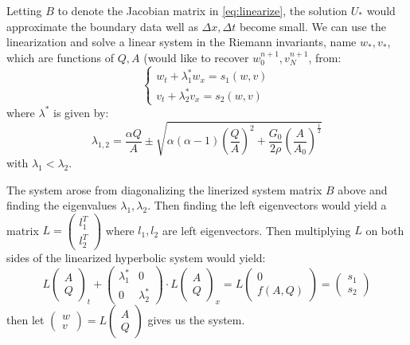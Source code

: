 \documentclass[12pt]{article} %
\begin{document}
Letting $B$ to denote the Jacobian matrix in \eqref{eq:linearize}, the solution $U_{*}$ would approximate the boundary data well as $\Delta x,\Delta t$ become small. We can use the linearization and solve a linear system in the Riemann invariants, name $w_{*}, v_{*}$, which are functions of $Q,A$ (would like to recover $w_0^{n+1}, v_{N}^{n+1}$, from:
$$
	\begin{cases}
		w_t + \lambda_1^{*} w_x = s_1(w,v) \\
		v_t + \lambda_2^{*} v_x = s_2(w,v)
	\end{cases}
$$ where $\lambda^{*}$ is given by:
$$
	\lambda_{1,2} = \frac{\alpha Q}{A}\pm \sqrt{\alpha(\alpha-1)(\frac{Q}{A})^2 + \frac{G_0}{2\rho}(\frac{A}{A_0})^{\frac12}}
$$ with $\lambda_1 < \lambda_2$.

The system arose from diagonalizing the linerized system matrix $B$ above and finding the eigenvalues $\lambda_1,\lambda_2$. Then finding the left eigenvectors would yield a matrix $L = \begin{pmatrix}
	l_1^{T} \\
	l_2^{T}
\end{pmatrix}$ where $l_1,l_2$ are left eigenvectors. Then multiplying $L$ on both sides of the linearized hyperbolic system would yield:
$$
	L\begin{pmatrix}
		 A \\
		 Q
	\end{pmatrix}_{t}
	+
	\begin{pmatrix}
		 \lambda_1^{*} & 0 \\
		 0 & \lambda_2^{*}
	\end{pmatrix} \cdot 
	L\begin{pmatrix}
		 A \\
		 Q
	\end{pmatrix}_{x}
	= 
	L\begin{pmatrix}
		 0 \\
		 f(A,Q)
	\end{pmatrix} =
	\begin{pmatrix}
		 s_1 \\
		 s_2
	\end{pmatrix}
$$ then let $\begin{pmatrix}
		 w \\
		 v
	\end{pmatrix} = L
	\begin{pmatrix}
		 A \\
		 Q
	\end{pmatrix}$ gives us the system.
\end{document}
